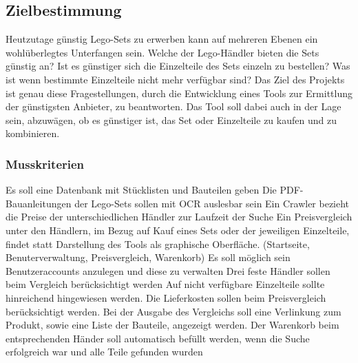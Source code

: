 \subsection{Zielbestimmung}

Heutzutage günstig Lego-Sets zu erwerben kann auf mehreren Ebenen ein wohlüberlegtes Unterfangen sein. Welche der Lego-Händler bieten die Sets günstig an? Ist es günstiger sich die Einzelteile des Sets einzeln zu bestellen? Was ist wenn bestimmte Einzelteile nicht mehr verfügbar sind? \newline
Das Ziel des Projekts ist genau diese Fragestellungen, durch die Entwicklung eines Tools zur Ermittlung der günstigsten Anbieter, zu beantworten. Das Tool soll dabei auch in der Lage sein, abzuwägen, ob es günstiger ist, das Set oder Einzelteile zu kaufen und zu kombinieren.

\subsubsection{Musskriterien}
Es soll eine Datenbank mit Stücklisten und Bauteilen geben \newline 
Die PDF-Bauanleitungen der Lego-Sets sollen mit OCR auslesbar sein \newline
Ein Crawler bezieht die Preise der unterschiedlichen Händler zur Laufzeit der Suche \newline
Ein Preisvergleich unter den Händlern, im Bezug auf Kauf eines Sets oder der jeweiligen Einzelteile, findet statt \newline
Darstellung des Tools als graphische Oberfläche. (Startseite, Benuterverwaltung, Preisvergleich, Warenkorb) \newline
Es soll möglich sein Benutzeraccounts anzulegen und diese zu verwalten \newline
Drei feste Händler sollen beim Vergleich berücksichtigt werden \newline
Auf nicht verfügbare Einzelteile sollte hinreichend hingewiesen werden. \newline
Die Lieferkosten sollen beim Preisvergleich berücksichtigt werden. \newline 
Bei der Ausgabe des Vergleichs soll eine Verlinkung zum Produkt, sowie eine Liste der Bauteile, angezeigt werden. \newline
Der Warenkorb beim entsprechenden Händer soll automatisch befüllt werden, wenn die Suche erfolgreich war und alle Teile gefunden wurden \newline

